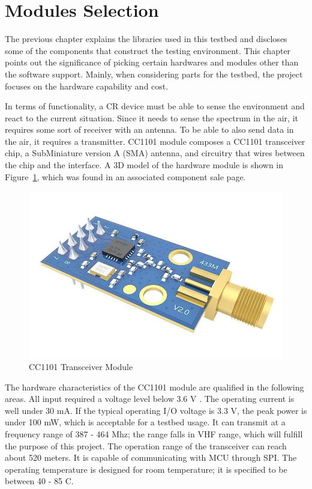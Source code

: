 \section{Modules Selection}

The previous chapter explains the libraries used in this testbed and discloses some of the components that construct the testing environment. This chapter points out the significance of picking certain hardwares and modules other than the software support. Mainly, when considering parts for the testbed, the project focuses on the hardware capability and cost. 

In terms of functionality, a CR device must be able to sense the environment and react to the current situation. Since it needs to sense the spectrum in the air, it requires some sort of receiver with an antenna. To be able to also send data in the air, it requires a transmitter. CC1101 module composes a CC1101 transceiver chip, a SubMiniature version A (SMA) antenna, and circuitry that wires between the chip and the interface. A 3D model of the hardware module is shown in Figure~\ref{fig:cc1101_module}, which was found in an associated component sale page.

\begin{figure}[ht]
\centering
\includegraphics[width=12cm]{figures/cc1101_module.jpg}
\caption{CC1101 Transceiver Module \cite{cc1101_module}}
\label{fig:cc1101_module}
\end{figure}

The hardware characteristics of the CC1101 module are qualified in the following areas. All input required a voltage level below 3.6 V \cite{cc1101_module}. The operating current is well under 30 mA. If the typical operating I/O voltage is 3.3 V, the peak power is under 100 mW, which is acceptable for a testbed usage. It can transmit at a frequency range of 387 - 464 Mhz; the range falls in VHF range, which will fulfill the purpose of this project. The operation range of the transceiver can reach about 520 meters. It is capable of communicating with MCU through SPI. The operating temperature is designed for room temperature; it is specified to be between 40 - 85 \textdegree{}C.

